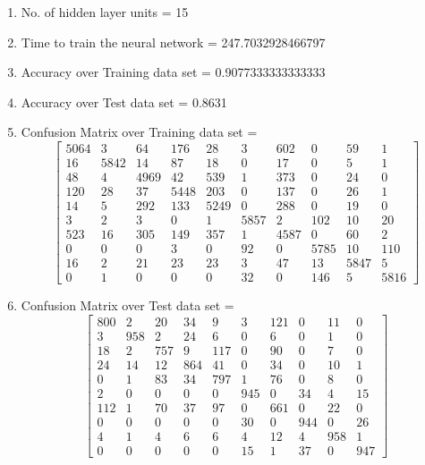 \documentclass[11pt]{article}
\begin{document}
\hline
\begin{enumerate}
\item No. of hidden layer units = 15
\item Time to train the neural network = 247.7032928466797
\item Accuracy over Training data set = 0.9077333333333333
\item Accuracy over Test data set = 0.8631
\item Confusion Matrix over Training data set = 
\begin{equation}
  \begin{bmatrix}
5064 & 3 & 64 & 176 & 28 & 3 & 602 & 0 & 59 & 1\\
16 & 5842 & 14 & 87 & 18 & 0 & 17 & 0 & 5 & 1\\
48 & 4 & 4969 & 42 & 539 & 1 & 373 & 0 & 24 & 0\\
120 & 28 & 37 & 5448 & 203 & 0 & 137 & 0 & 26 & 1\\
14 & 5 & 292 & 133 & 5249 & 0 & 288 & 0 & 19 & 0\\
3 & 2 & 3 & 0 & 1 & 5857 & 2 & 102 & 10 & 20\\
523 & 16 & 305 & 149 & 357 & 1 & 4587 & 0 & 60 & 2\\
0 & 0 & 0 & 3 & 0 & 92 & 0 & 5785 & 10 & 110\\
16 & 2 & 21 & 23 & 23 & 3 & 47 & 13 & 5847 & 5\\
0 & 1 & 0 & 0 & 0 & 32 & 0 & 146 & 5 & 5816
  \end{bmatrix}
\end{equation}
\item Confusion Matrix over Test data set = 
\begin{equation}
  \begin{bmatrix}
800 & 2 & 20 & 34 & 9 & 3 & 121 & 0 & 11 & 0\\
3 & 958 & 2 & 24 & 6 & 0 & 6 & 0 & 1 & 0\\
18 & 2 & 757 & 9 & 117 & 0 & 90 & 0 & 7 & 0\\
24 & 14 & 12 & 864 & 41 & 0 & 34 & 0 & 10 & 1\\
0 & 1 & 83 & 34 & 797 & 1 & 76 & 0 & 8 & 0\\
2 & 0 & 0 & 0 & 0 & 945 & 0 & 34 & 4 & 15\\
112 & 1 & 70 & 37 & 97 & 0 & 661 & 0 & 22 & 0\\
0 & 0 & 0 & 0 & 0 & 30 & 0 & 944 & 0 & 26\\
4 & 1 & 4 & 6 & 6 & 4 & 12 & 4 & 958 & 1\\
0 & 0 & 0 & 0 & 0 & 15 & 1 & 37 & 0 & 947
  \end{bmatrix}
\end{equation}
\end{enumerate}
\end{document}
